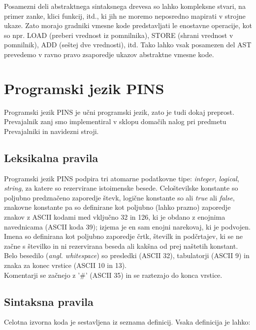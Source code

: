 \documentclass[a4paper, 12pt]{book}
\begin{document}
Posamezni deli abstraktnega sintaksnega drevesa so lahko kompleksne stvari, na primer zanke, klici funkcij, itd., ki jih ne moremo neposredno mapirati v strojne ukaze. Zato morajo gradniki vmesne kode predstavljati le enostavne operacije, kot so npr. LOAD (preberi vrednost iz pomnilnika), STORE (shrani vrednost v pomnilnik), ADD (seštej dve vrednosti), itd. Tako lahko vsak posamezen del AST prevedemo v ravno pravo zsaporedje ukazov abstraktne vmesne kode. \cite{modernCompiler} \\ 

\chapter{Programski jezik PINS}

Programski jezik PINS je učni programski jezik, zato je tudi dokaj preprost. Prevajalnik zanj smo implementiral v sklopu domačih nalog pri predmetu Prevajalniki in navidezni stroji.

\section{Leksikalna pravila}

Programski jezik PINS podpira tri atomarne podatkovne tipe: \textit{integer}, \textit{logical}, \textit{string}, za katere so rezervirane istoimenske besede. Celoštevilske konstante so poljubno predznačeno zaporedje števk, logične konstante so ali \textit{true} ali \textit{false}, znakovne konstante pa so definirane kot poljubno (lahko prazno) zaporedje znakov z ASCII kodami med vključno 32 in 126, ki je obdano z enojnima navednicama (ASCII koda 39); izjema je en sam enojni narekovaj, ki je podvojen. \\
\indent Imena so definirana kot poljubno zaporedje črtk, številk in podčrtajev, ki se ne začne s številko in ni rezervirana beseda ali kakšna od prej naštetih konstant. \\
\indent Belo besedilo (\textit{angl. whitespace}) so presledki (ASCII 32), tabulatorji (ASCII 9) in znaka za konec vrstice (ASCII 10 in 13). \\
\indent Komentarji se začnejo z '\#' (ASCII 35) in se raztezajo do konca vrstice.

\section{Sintaksna pravila}

Celotna izvorna koda je sestavljena iz seznama definicij. Vsaka definicija je lahko:
\end{document}
